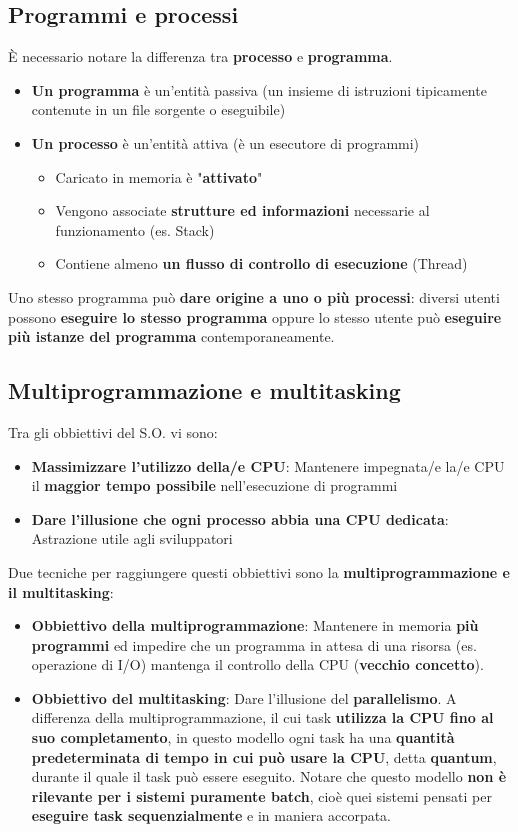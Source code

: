 \documentclass[12pt]{article}
\begin{document}
\subsection{Programmi e processi}
È necessario notare la differenza tra \textbf{processo} e \textbf{programma}.
\begin{itemize}
    \item \textbf{Un programma} è un'entità passiva (un insieme di istruzioni tipicamente contenute in un file sorgente o eseguibile)
    \item \textbf{Un processo} è un'entità attiva (è un esecutore di programmi)
          \begin{itemize}
              \item Caricato in memoria è "\textbf{attivato}"
              \item Vengono associate \textbf{strutture ed informazioni} necessarie al funzionamento (es. Stack)
              \item Contiene almeno \textbf{un flusso di controllo di esecuzione} (Thread)
          \end{itemize}
\end{itemize}
Uno stesso programma può \textbf{dare origine a uno o più processi}: diversi utenti possono \textbf{eseguire lo stesso programma} oppure lo stesso utente può \textbf{eseguire più istanze del programma} contemporaneamente.
\subsection{Multiprogrammazione e multitasking}
Tra gli obbiettivi del S.O. vi sono:
\begin{itemize}
    \item \textbf{Massimizzare l'utilizzo della/e CPU}: Mantenere impegnata/e la/e CPU il \textbf{maggior tempo possibile} nell'esecuzione di programmi
    \item \textbf{Dare l'illusione che ogni processo abbia una CPU dedicata}: Astrazione utile agli sviluppatori
\end{itemize}
Due tecniche per raggiungere questi obbiettivi sono la \textbf{multiprogrammazione e il multitasking}:
\begin{itemize}
    \item \textbf{Obbiettivo della multiprogrammazione}: Mantenere in memoria \textbf{più programmi} ed impedire che un programma in attesa di una risorsa (es. operazione di I/O) mantenga il controllo della CPU (\textbf{vecchio concetto}).
    \item \textbf{Obbiettivo del multitasking}: Dare l'illusione del \textbf{parallelismo}. A differenza della multiprogrammazione, il cui task \textbf{utilizza la CPU fino al suo completamento}, in questo modello ogni task ha una \textbf{quantità predeterminata di tempo in cui può usare la CPU}, detta \textbf{quantum}, durante il quale il task può essere eseguito. Notare che questo modello \textbf{non è rilevante per i sistemi puramente batch}, cioè quei sistemi pensati per \textbf{eseguire task sequenzialmente} e in maniera accorpata.
\end{itemize}
\end{document}
